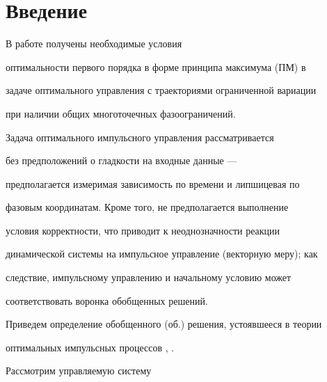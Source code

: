 \date{}




\pagestyle{plain} %







\maketitle


\label{begin}





\section{Введение}





В работе получены необходимые условия


оптимальности первого порядка в форме принципа максимума (ПМ) в


задаче оптимального управления с траекториями ограниченной вариации


при наличии общих многоточечных фазоограничений.


Задача оптимального импульсного управления рассматривается


без предположений о гладкости на входные данные ---


предполагается измеримая зависимость по времени и липшицевая по


фазовым координатам. Кроме того, не предполагается выполнение


условия корректности, что приводит к неоднозначности реакции


динамической системы на импульсное управление (векторную меру); как


следствие, импульсному управлению и начальному условию может


соответствовать воронка обобщенных решений.





Приведем определение обобщенного (об.) решения, устоявшееся в теории


оптимальных импульсных процессов \cite{80}, \cite{75}.


Рассмотрим управляемую систему


